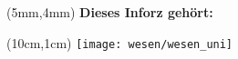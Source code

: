 \thispagestyle{empty}

\begin{textblock*}{10cm}(5mm,4mm)
    \normalsize \textbf{Dieses Inforz gehört:}
\end{textblock*}

\begin{textblock*}{4cm}(10cm,1cm)
    \texttt{[image: wesen/wesen\_uni]}
\end{textblock*}
